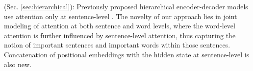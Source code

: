  (Sec. \ref{sec:hierarchical}): Previously proposed hierarchical encoder-decoder models use attention only at sentence-level \cite{hiero_encdec}. The novelty of our approach lies in joint modeling of attention at both sentence and word levels, where the word-level attention is further influenced by sentence-level attention, thus capturing the notion of important sentences and important words within those sentences. Concatenation of positional embeddings with the hidden state at sentence-level is also new.

